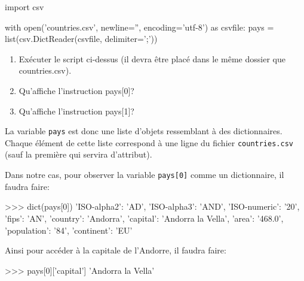 \begin{CodePythontexAlt}[Largeur=1\linewidth,Centre,PremLigne=1, lineNumbers=false]{}
import csv

with open('countries.csv', newline='', encoding='utf-8') as csvfile:
    pays = list(csv.DictReader(csvfile, delimiter=';'))
\end{CodePythontexAlt}

\begin{exercice_cours}{}
\begin{enumerate}
	\item Exécuter le script ci-dessus (il devra être placé dans le même dossier que countries.csv).
	\item Qu'affiche l'instruction pays[0]?
	\item Qu'affiche l'instruction pays[1]?
\end{enumerate}
\end{exercice_cours}




\begin{remarque}{\quad}{}
La variable \verb+pays+ est donc une liste d'objets ressemblant à des dictionnaires. Chaque élément de cette liste correspond à une ligne du fichier \verb|countries.csv| (sauf la première qui servira d'attribut).

\end{remarque}

\medskip

Dans notre cas, pour observer la variable \verb+pays[0]+ comme un dictionnaire, il faudra faire:

\begin{CodePythontexAlt}[Largeur=1\linewidth,Centre,PremLigne=1, lineNumbers=false]{}
>>> dict(pays[0])
{'ISO-alpha2': 'AD', 'ISO-alpha3': 'AND', 'ISO-numeric': '20', 'fips': 'AN', 'country': 'Andorra', 
 'capital': 'Andorra la Vella', 'area': '468.0', 'population': '84', 'continent': 'EU'}
\end{CodePythontexAlt}

\medskip

Ainsi pour accéder à la capitale de l'Andorre, il faudra faire:
	
\begin{CodePythontexAlt}[Largeur=1\linewidth,Centre,PremLigne=1, lineNumbers=false]{}
>>> pays[0]['capital']
'Andorra la Vella'
\end{CodePythontexAlt}

